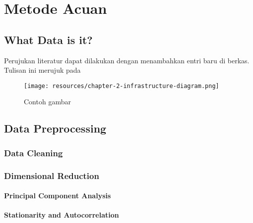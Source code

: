 \chapter{Metode Acuan}

\section{What Data is it?}
Perujukan literatur dapat dilakukan dengan menambahkan entri baru di berkas. Tulisan ini merujuk pada \parencite{knuth2001art}

\begin{figure}[h]
    \centering
    \texttt{[image: resources/chapter-2-infrastructure-diagram.png]}
    \caption{Contoh gambar}
\end{figure}

\section{Data Preprocessing}

    \subsection{Data Cleaning}

    \subsection{Dimensional Reduction}

        \subsubsection{Principal Component Analysis}

        \subsubsection{Stationarity and Autocorrelation}
